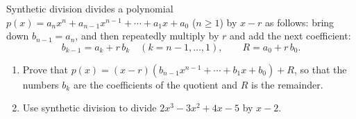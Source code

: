 Synthetic division divides a polynomial $p(x)=a_nx^n+a_{n-1}x^{n-1}+\cdots+a_1x+a_0$ ($n\ge1$) by $x-r$ as follows: bring down $b_{n-1}=a_n$, and then repeatedly multiply by $r$ and add the next coefficient:
\[b_{k-1}=a_k+r\,b_k\quad(k=n-1,\dots,1),\qquad R=a_0+r\,b_0.\]
\begin{enumerate}
\item[(a)] Prove that $p(x)=(x-r)\left(b_{n-1}x^{n-1}+\cdots+b_1x+b_0\right)+R$, so that the numbers $b_k$ are the coefficients of the quotient and $R$ is the remainder.
\item[(b)] Use synthetic division to divide $2x^3-3x^2+4x-5$ by $x-2$.
\end{enumerate}
